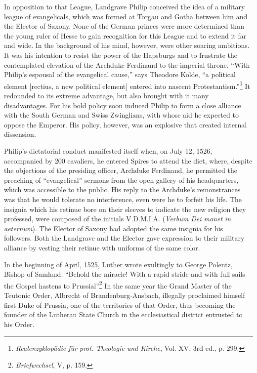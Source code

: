 In opposition to that League, Landgrave Philip conceived the idea
of a military league of evangelicals, which was formed at Torgau and
Gotha between him and the Elector of Saxony. None of the German
princes were more determined than the young ruler of Hesse to gain
recognition for this League and to extend it far and wide. In the
background of his mind, however, were other soaring ambitions. It
was his intention to resist the power of the Hapsburgs and to frustrate
the contemplated elevation of the Archduke Ferdinand to the imperial throne.
“With Philip’s espousal of the evangelical cause,” says
Theodore Kolde, “a political element [rectius, a new political element]
entered into nascent Protestantism.”\footnote
{\textit{Realenzyklopädie für prot. Theologie und Kirche}, Vol. XV, 3rd ed., p. 299.}
It redounded to its extreme
advantage, but also brought with it many disadvantages. For his bold
policy soon induced Philip to form a close alliance with the South
German and Swiss Zwinglians, with whose aid he expected to oppose
the Emperor. His policy, however, was an explosive that created internal
dissension.

Philip’s dictatorial conduct manifested itself when, on July 12,
1526, accompanied by 200 cavaliers, he entered Spires to attend
the diet, where, despite the objections of the presiding officer, Archduke
Ferdinand, he permitted the preaching of “evangelical” sermons
from the open gallery of his headquarters, which was accessible to
the public. His reply to the Archduke’s remonstrances was that
he would tolerate no interference, even were he to forfeit his life.
The insignia which his retinue bore on their sleeves to indicate the
new religion they professed, were composed of the initials V.D.M.I.A.
(\textit{Verbum Dei manet in aeternum}). The Elector of Saxony had
adopted the same insignia for his followers. Both the Landgrave and
the Elector gave expression to their military alliance by vesting their
retinue with uniforms of the same color.

In the beginning of April, 1525, Luther wrote exultingly to
George Polentz, Bishop of Samland: “Behold the miracle! With a
rapid stride and with full sails the Gospel hastens to Prussial”\footnote
{\textit{Briefwechsel}, V, p. 159.}
In the same year the Grand Master of the Teutonic Order, Albrecht of
Brandenburg-Ansbach, illegally proclaimed himself first Duke of
Prussia, one of the territories of that Order, thus becoming the founder
of the Lutheran State Church in the ecclesiastical district entrusted to
his Order.

